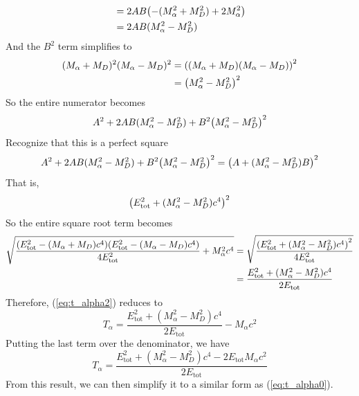 \documentclass[12pt,a4paper]{article}
\begin{document}
\begin{solution_pset}
\begin{align*}
				&= 
				2AB
				\pqty{
					-(M_\alpha^2 + M_D^2)
					+ 2M_\alpha^2
				}\\
				&=
				2AB(M_\alpha^2 - M_D^2)
			\end{align*}
			And the $B^2$ term simplifies to 
			\begin{align*}
				(M_\alpha + M_D)^2 
				(M_\alpha - M_D)^2 
				&=
				\pqty{
					(M_\alpha + M_D)
					(M_\alpha - M_D) 
				}^2\\
				&=
				\pqty{
					M_\alpha^2 - M_D^2
				}^2
			\end{align*}
			So the entire numerator becomes
			\[
				A^2 
				+
				2AB
				(M_\alpha^2 - M_D^2)
				+
				B^2
				\pqty{
					M_\alpha^2 - M_D^2
				}^2
			\]
			Recognize that this is a perfect square
			\[
				A^2 
				+
				2AB
				(M_\alpha^2 - M_D^2)
				+
				B^2
				\pqty{
					M_\alpha^2 - M_D^2
				}^2
				=
				\pqty{
					A 
					+ 
					(
						M_\alpha^2 - M_D^2
					)
					B
				}^2
			\]
			That is,
			\[
				\pqty{
					E_\text{tot}^2 
					+ 
					(
						M_\alpha^2 - M_D^2
					)
					c^4
				}^2
			\]
			So the entire square root term becomes
			\begin{align*}
				\sqrt{
					\frac{
						\pqty{
							E_\text{tot}^2 - (M_\alpha + M_D)c^4 
						}
						\pqty{
							E_\text{tot}^2 - (M_\alpha - M_D)c^4 
						}
					}{
						4E_\text{tot}^2
					} 
					+ M_\alpha^2 c^4
				} 
				&=
				\sqrt{
					\frac{
						\pqty{
							E_\text{tot}^2 
							+ 
							(
								M_\alpha^2 - M_D^2
							)
							c^4
						}^2
					}{
						4E_\text{tot}^2 
					} 
				}
				\\
				&=
				\frac{
					E_\text{tot}^2 
					+ 
					(
						M_\alpha^2 - M_D^2
					)
					c^4
				}{
					2E_\text{tot} 
				} 
			\end{align*}
			Therefore, (\ref{eq:t_alpha2}) reduces to 
			\[
				T_\alpha
				=
				\frac{
					E_\text{tot}^2 
					+ 
					(
						M_\alpha^2 - M_D^2
					)
					c^4
				}{
					2E_\text{tot} 
				} 
				- 
				M_\alpha c^2 
			\]
			Putting the last term over the denominator, we have
			\begin{equation}
				\label{eq:t_alpha3}
				T_\alpha
				=
				\frac{
					E_\text{tot}^2 
					+ 
					(
						M_\alpha^2 - M_D^2
					)
					c^4
					- 
					2E_\text{tot} 
					M_\alpha c^2 
				}{
					2E_\text{tot} 
				} 
			\end{equation}
			From this result, we can then simplify it to a similar form as (\ref{eq:t_alpha0}).


\end{solution_pset}
\end{document}
